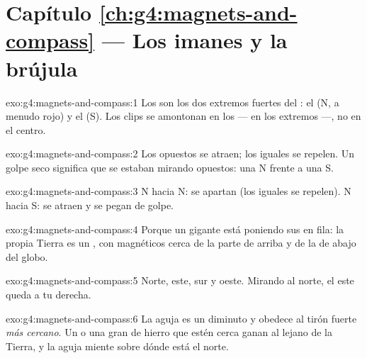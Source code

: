 \section*{Capítulo \ref{ch:g4:magnets-and-compass} --- Los imanes y la brújula}

\begin{solution}{exo:g4:magnets-and-compass:1}
Los  son los dos extremos fuertes del : el
 (N, a menudo rojo) y el  (S). Los clips se
amontonan en los  --- en los extremos ---, no en el centro.
\end{solution}

\begin{solution}{exo:g4:magnets-and-compass:2}
Los  opuestos se atraen; los iguales se repelen. Un golpe
seco significa que se estaban mirando  opuestos: una N frente a
una S.
\end{solution}

\begin{solution}{exo:g4:magnets-and-compass:3}
N hacia N: se apartan (los  iguales se repelen). N hacia S: se
atraen y se pegan de golpe.
\end{solution}

\begin{solution}{exo:g4:magnets-and-compass:4}
Porque un  gigante está poniendo sus  en fila: la propia
Tierra es un , con  magnéticos cerca de la parte de
arriba y de la de abajo del globo.
\end{solution}

\begin{solution}{exo:g4:magnets-and-compass:5}
Norte, este, sur y oeste. Mirando al norte, el este queda a tu
derecha.
\end{solution}

\begin{solution}{exo:g4:magnets-and-compass:6}
La aguja es un  diminuto y obedece al tirón fuerte \emph{más
cercano}. Un  o una gran  de hierro que estén cerca ganan
al lejano  de la Tierra, y la aguja miente sobre dónde está el
norte.
\end{solution}

